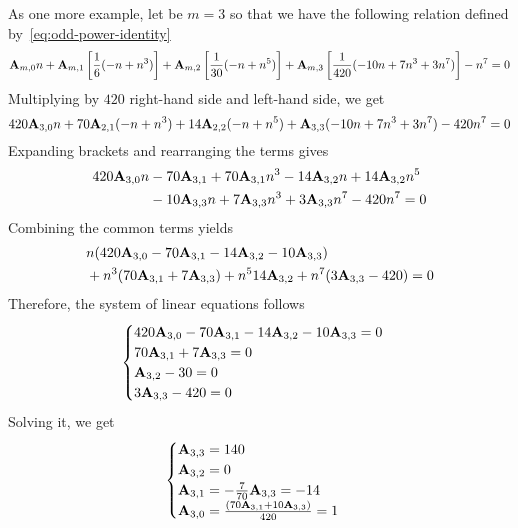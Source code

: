 As one more example, let be $m=3$ so that we have the following relation defined by~\eqref{eq:odd-power-identity}
\begin{equation*}
    {\mathbf{A}} \sb{m,0} n
    + {\mathbf{A}} \sb{m,1} \left[ \frac{1}{6} (-n + n^3) \right]
    + {\mathbf{A}} \sb{m,2} \left[ \frac{1}{30} (-n + n^5) \right]
    + {\mathbf{A}} \sb{m,3} \left[ \frac{1}{420} (-10 n + 7 n^3 + 3 n^7) \right] - n^7 = 0
\end{equation*}
Multiplying by $420$ right-hand side and left-hand side, we get
\begin{equation*}
    420 {\mathbf{A}} \sb{3,0} n + 70 {\mathbf{A}} \sb{2,1} (-n + n^3) + 14 {\mathbf{A}} \sb{2,2} (-n + n^5) + {\mathbf{A}} \sb{3,3} (-10 n + 7 n^3 + 3 n^7) - 420n^7 = 0
\end{equation*}
Expanding brackets and rearranging the terms gives
\begin{equation*}
    \begin{split}
        420 {\mathbf{A}} \sb{3,0} n
        &- 70 {\mathbf{A}} \sb{3,1} + 70 {\mathbf{A}} \sb{3,1} n^3 - 14 {\mathbf{A}} \sb{3,2} n + 14 {\mathbf{A}} \sb{3,2} n^5 \\
        &- 10 {\mathbf{A}} \sb{3,3} n + 7 {\mathbf{A}} \sb{3,3} n^3 + 3 {\mathbf{A}} \sb{3,3} n^7 - 420n^7 = 0
    \end{split}
\end{equation*}
Combining the common terms yields
\begin{equation*}
    \begin{split}
        &n (420 {\mathbf{A}} \sb{3,0} - 70 {\mathbf{A}} \sb{3,1} - 14 {\mathbf{A}} \sb{3,2} - 10 {\mathbf{A}} \sb{3,3}) \\
        &+ n^3 (70 {\mathbf{A}} \sb{3,1} + 7 {\mathbf{A}} \sb{3,3})
        + n^5 14 {\mathbf{A}} \sb{3,2}
        + n^7 (3 {\mathbf{A}} \sb{3,3} - 420)
        = 0
    \end{split}
\end{equation*}
Therefore, the system of linear equations follows
\begin{equation*}
    \begin{cases}
        420 {\mathbf{A}} \sb{3,0} - 70 {\mathbf{A}} \sb{3,1} - 14 {\mathbf{A}} \sb{3,2} - 10 {\mathbf{A}} \sb{3,3} = 0 \\
        70 {\mathbf{A}} \sb{3,1} + 7 {\mathbf{A}} \sb{3,3} = 0 \\
        {\mathbf{A}} \sb{3,2} - 30 = 0 \\
        3 {\mathbf{A}} \sb{3,3} - 420 = 0
    \end{cases}
\end{equation*}
Solving it, we get
\begin{equation*}
    \begin{cases}
        {\mathbf{A}} \sb{3,3} = 140 \\
        {\mathbf{A}} \sb{3,2} = 0 \\
        {\mathbf{A}} \sb{3,1} = -\frac{7}{70} {\mathbf{A}} \sb{3,3} = -14 \\
        {\mathbf{A}} \sb{3,0} = \frac{(70 {\mathbf{A}} \sb{3,1} + 10 {\mathbf{A}} \sb{3,3})}{420} = 1
    \end{cases}
\end{equation*}
